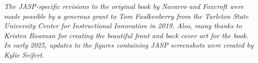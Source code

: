 

\newpage

\vspace*{7cm}
\begin{center}
{\it \large
  The JASP-specific revisions to the original book by Navarro and Foxcroft were made possible by a generous grant to Tom Faulkenberry from the Tarleton State University Center for Instructional Innovation in 2019. Also, many thanks to Kristen Bowman for creating the beautiful front and back cover art for the book.  In early 2025, updates to the figures containing JASP screenshots were created by Kylie Seifert.
}
\end{center}

